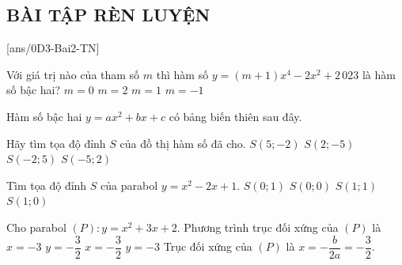\subsection{BÀI TẬP RÈN LUYỆN}
 
\setcounter{ex}{0}
[ans/0D3-Bai2-TN]%
\begin{ex}%
	Với giá trị nào của tham số $m$ thì hàm số $y=(m+1)x^4-2x^2+2\,023$ là hàm số bậc hai?
	\choice
	{$m=0$}
	{$m=2$}
	{$m=1$}
	{\True $m=-1$}
\end{ex}

\begin{ex}%
	Hàm số bậc hai $y=ax^2+bx+c$ có bảng biến thiên sau đây. 
		\begin{center}
		\end{center}
		Hãy tìm tọa độ đỉnh $S$ của đồ thị hàm số đã cho.
	\choice
	{$S(5;-2)$}
	{\True $S(2;-5)$}
	{$S(-2;5)$}
	{$S(-5;2)$}
\end{ex}

\begin{ex}%
	Tìm tọa độ đỉnh $S$ của parabol $y=x^2-2x+1$.
	\choice
	{$S(0; 1)$}
	{$S(0; 0)$}
	{$S(1; 1)$}
	{\True $S(1; 0)$}
\end{ex}

\begin{ex}%
	Cho parabol $(P)\colon y=x^2+3x+2$. Phương trình trục đối xứng của $(P)$ là
	\choice
	{$x=-3$}
	{$y=-\dfrac{3}{2}$}
	{\True $x=-\dfrac{3}{2}$}
	{$y=-3$}
	\loigiai
	{
		Trục đối xứng của $(P)$ là $x=-\dfrac{b}{2a}=-\dfrac{3}{2}$.
	}
\end{ex}

